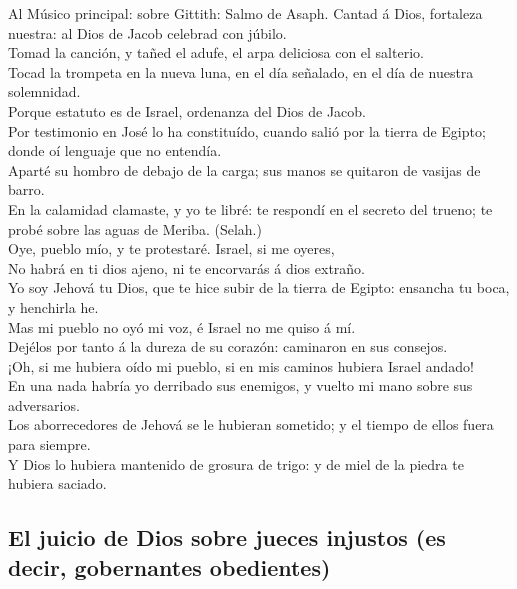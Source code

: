  Al Músico principal: sobre Gittith: Salmo de Asaph.
Cantad á Dios, fortaleza nuestra: al Dios de Jacob celebrad con
júbilo.\\
 Tomad la canción, y tañed el adufe, el arpa deliciosa con
el salterio.\\
 Tocad la trompeta en la nueva luna, en el día señalado,
en el día de nuestra solemnidad.\\
 Porque estatuto es de Israel, ordenanza del Dios de
Jacob.\\
 Por testimonio en José lo ha constituído, cuando salió
por la tierra de Egipto; donde oí lenguaje que no entendía.\\
 Aparté su hombro de debajo de la carga; sus manos se
quitaron de vasijas de barro.\\
 En la calamidad clamaste, y yo te libré: te respondí en
el secreto del trueno; te probé sobre las aguas de Meriba. (Selah.)\\
 Oye, pueblo mío, y te protestaré. Israel, si me oyeres,\\
 No habrá en ti dios ajeno, ni te encorvarás á dios
extraño.\\
 Yo soy Jehová tu Dios, que te hice subir de la tierra de
Egipto: ensancha tu boca, y henchirla he.\\
 Mas mi pueblo no oyó mi voz, é Israel no me quiso á
mí.\\
 Dejélos por tanto á la dureza de su corazón: caminaron
en sus consejos.\\
 ¡Oh, si me hubiera oído mi pueblo, si en mis caminos
hubiera Israel andado!\\
 En una nada habría yo derribado sus enemigos, y vuelto
mi mano sobre sus adversarios.\\
 Los aborrecedores de Jehová se le hubieran sometido; y
el tiempo de ellos fuera para siempre.\\
 Y Dios lo hubiera mantenido de grosura de trigo: y de
miel de la piedra te hubiera saciado.

\hypertarget{el-juicio-de-dios-sobre-jueces-injustos-es-decir-gobernantes-obedientes}{%
\subsection{El juicio de Dios sobre jueces injustos (es decir,
gobernantes
obedientes)}\label{el-juicio-de-dios-sobre-jueces-injustos-es-decir-gobernantes-obedientes}}

